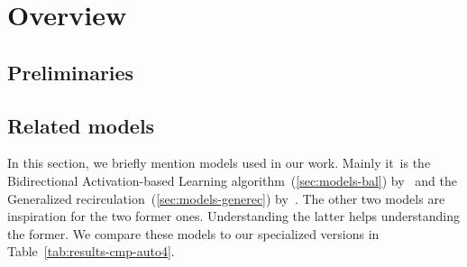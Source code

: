 



\section{Overview}
\label{sec:overview} 

\subsection{Preliminaries}
\label{sec:theory} 

 



\subsection{Related models}
\label{sec:overview-models}  

In this section, we briefly mention models used in our work. Mainly it~is the Bidirectional Activation-based Learning algorithm~(\ref{sec:models-bal}) by~\citet{farkas2013bal} and the Generalized recirculation~(\ref{sec:models-generec}) by~\citet{o1996bio}. The other two models are inspiration for the two former ones. Understanding the latter helps understanding the former. We compare these models to our specialized versions in Table~\ref{tab:results-cmp-auto4}. 










 
